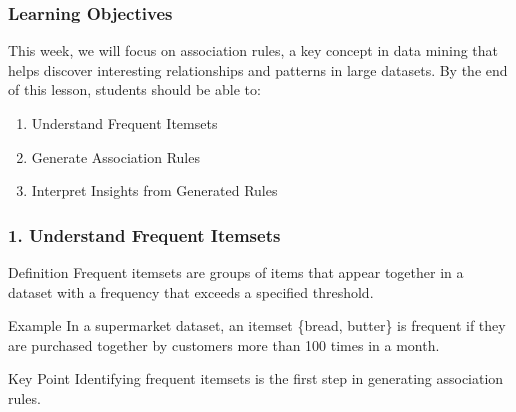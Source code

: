 \documentclass[aspectratio=169]{beamer}
\begin{document}
\begin{frame}[fragile]
    \frametitle{Learning Objectives}
    This week, we will focus on association rules, a key concept in data mining that helps discover interesting relationships and patterns in large datasets. 
    By the end of this lesson, students should be able to:
    \begin{enumerate}
        \item Understand Frequent Itemsets
        \item Generate Association Rules
        \item Interpret Insights from Generated Rules
    \end{enumerate}
\end{frame}

\begin{frame}[fragile]
    \frametitle{1. Understand Frequent Itemsets}
    \begin{block}{Definition}
        Frequent itemsets are groups of items that appear together in a dataset with a frequency that exceeds a specified threshold.
    \end{block}
    \begin{exampleblock}{Example}
        In a supermarket dataset, an itemset \{bread, butter\} is frequent if they are purchased together by customers more than 100 times in a month.
    \end{exampleblock}
    \begin{block}{Key Point}
        Identifying frequent itemsets is the first step in generating association rules.
    \end{block}
\end{frame}
\end{document}

